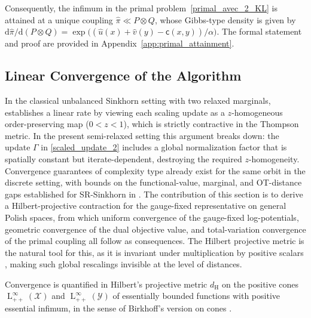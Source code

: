 \documentclass{article}
\begin{document}
Consequently, the infimum in the primal problem~\eqref{primal_avec_2_KL} is attained at a unique coupling $\hat{\pi} \ll P \otimes Q$, whose Gibbs-type density is given by $\mathrm{d}\hat{\pi}/\mathrm{d}(P \otimes Q) = \exp\!\bigl((\hat{u}(x) + \hat{v}(y) - \mathsf{c}(x,y))/\alpha\bigr)$. The formal statement and proof are provided in Appendix~\ref{app:primal_attainment}.

\subsection{Linear Convergence of the Algorithm}

In the classical unbalanced Sinkhorn setting with two relaxed marginals,
\cite[Theorem~3.11]{chizat2018scaling} establishes a linear rate by viewing each
scaling update as a $z$-homogeneous order-preserving map ($0 < z < 1$), which is
strictly contractive in the Thompson metric. In the present semi-relaxed setting this
argument breaks down: the update $\Gamma$ in \eqref{scaled_update_2} includes a global
normalization factor that is spatially constant but iterate-dependent, destroying the
required $z$-homogeneity. Convergence guarantees of complexity type already exist for
the same orbit in the discrete setting, with bounds on the functional-value, marginal,
and OT-distance gaps established for SR-Sinkhorn in \cite{fukunaga2022convergence}. The
contribution of this section is to derive a Hilbert-projective contraction for the
gauge-fixed representative on general Polish spaces, from which uniform convergence of
the gauge-fixed log-potentials, geometric convergence of the dual objective value, and
total-variation convergence of the primal coupling all follow as consequences. The
Hilbert projective metric is the natural tool for this, as it is invariant under
multiplication by positive scalars \cite[Lemma~2.1(iv)]{Lemmens2013BirkhoffsVO}, making
such global rescalings invisible at the level of distances.

Convergence is quantified in Hilbert's projective metric $d_{\mathrm H}$ on the positive cones $\operatorname{L}^\infty_{++}(\mathcal X)$ and $\operatorname{L}^\infty_{++}(\mathcal Y)$ of essentially bounded functions with positive essential infimum, in the sense of Birkhoff's version on cones \cite[Equation~(2.2)]{Lemmens2013BirkhoffsVO}.
\end{document}

